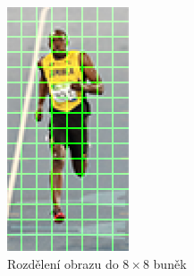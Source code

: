  \begin{figure}[H]
\centering
\includegraphics[width=3.6cm]{figures/hog_cells}
\caption{Rozdělení obrazu do $8\times8$ buněk \cite{hog:obr}}
\label{hog_cells}
\end{figure}


